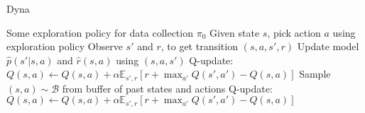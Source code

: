 \begin{algorithm}[t!]
\caption{Dyna}
\begin{algorithmic}[1]
\label{alg:dyna}
\REQUIRE Some exploration policy for data collection $\pi_0$
\STATE Given state $s$, pick action $a$ using exploration policy
\STATE Observe $s'$ and $r$, to get transition $(s,a,s',r)$
\STATE Update model $\hat{p}(s'|s,a)$ and $\hat{r}(s,a)$ using $(s,a,s')$
\STATE Q-update: $Q(s,a)\leftarrow Q(s,a) + \alpha\mathbb{E}_{s',r}\left[r + \max_{a'} Q(s',a')-Q(s,a)\right]$
\STATE Sample $(s,a)\sim \mathcal{B}$ from buffer of past states and actions
\STATE Q-update: $Q(s,a)\leftarrow Q(s,a) + \alpha\mathbb{E}_{s',r}\left[r + \max_{a'} Q(s',a')-Q(s,a)\right]$
\ENDFOR
\end{algorithmic}
\end{algorithm}